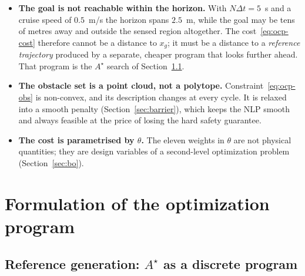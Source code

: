 \documentclass[11pt,a4paper]{article}
\newcommand{\astar}{$A^\star$}
\begin{document}
\begin{itemize}
  \item \textbf{The goal is not reachable within the horizon.} With $N\Delta t=5$~s and a cruise speed of
        $0.5$~m/s the horizon spans $2.5$~m, while the goal may be tens of metres away and outside the
        sensed region altogether. The cost~\eqref{eq:ocp-cost} therefore cannot be a distance to $x_g$; it
        must be a distance to a \emph{reference trajectory} produced by a separate, cheaper program that
        looks further ahead. That program is the \astar{} search of Section~\ref{sec:astar}.
  \item \textbf{The obstacle set is a point cloud, not a polytope.} Constraint~\eqref{eq:ocp-obs} is
        non-convex, and its description changes at every cycle. It is relaxed into a smooth penalty
        (Section~\ref{sec:barrier}), which keeps the NLP smooth and always feasible at the price of losing
        the hard safety guarantee.
  \item \textbf{The cost is parametrised by $\theta$.} The eleven weights in $\theta$ are not physical
        quantities; they are design variables of a second-level optimization problem
        (Section~\ref{sec:bo}).
\end{itemize}

\section{Formulation of the optimization program}
\label{sec:formulation}

\subsection{Reference generation: \astar{} as a discrete program}
\label{sec:astar}
\end{document}
